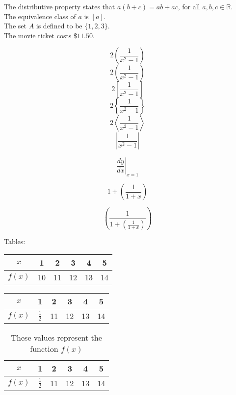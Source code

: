 \documentclass{article}
\begin{document}
The distributive property states that $a(b+c)=ab+ac$, for all $a, b, c \in \mathbb{R}$. \\[6pt]
The equivalence class of $a$ is $[a]$. \\[6pt]
The set $A$ is defined to be $\{1,2,3\}$. \\[6pt]
The movie ticket costs $\$11.50$.

$$2(\frac{1}{x^2-1})$$
$$2\left(\frac{1}{x^2-1}\right)$$
$$2\left[\frac{1}{x^2-1}\right]$$
$$2\left\{\frac{1}{x^2-1}\right\}$$ %
$$2\left \langle    \frac{1}{x^2-1} \right     \rangle $$
$$\left | \frac{1}{x^2-1}  \right |$$

$$\left. \frac{dy}{dx} \right|_{x=1}$$ %

$$1+{\left ( \frac{1}{1+x} \right )}$$

$$\left ( \frac{1}{1+{\left ( \frac{1}{1+x} \right )}} \right )$$

Tables: \\

\begin{tabular}{|c||c|c|c|c|c|} %
\hline
$x$ & 1 & 2 & 3 & 4 & 5 \\ \hline
$f(x)$ & 10 & 11 & 12 & 13 & 14 \\ \hline
\end{tabular}

\vspace{1cm}

\begin{table}
\begin{tabular}{|c||c|c|c|c|c|}
\hline
$x$ & 1 & 2 & 3 & 4 & 5 \\ \hline
$f(x)$ & $\frac{1}{2}$ & 11 & 12 & 13 & 14 \\ \hline
\end{tabular} 
\end{table}

\begin{table}[H]
\centering %
\def\arraystretch{1.2} %
\begin{tabular}{|c||c|c|c|c|c|}
\hline
$x$ & 1 & 2 & 3 & 4 & 5 \\ \hline
$f(x)$ & $\frac{1}{2}$ & 11 & 12 & 13 & 14 \\ \hline
\end{tabular} 
\caption{These values represent the function $f(x)$}
\end{table}
\end{document}
